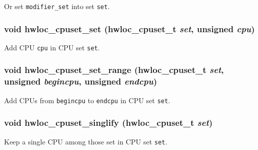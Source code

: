 Or set {\tt modifier\_\-set} into set {\tt set}. 

\hypertarget{group__hwlocality__cpuset_gc5ba8c6d6367436995f67dbd4b3ba1de}{
\subsubsection[{hwloc\_\-cpuset\_\-set}]{\setlength{\rightskip}{0pt plus 5cm}void hwloc\_\-cpuset\_\-set ({\bf hwloc\_\-cpuset\_\-t} {\em set}, \/  unsigned {\em cpu})}}
\label{group__hwlocality__cpuset_gc5ba8c6d6367436995f67dbd4b3ba1de}


Add CPU {\tt cpu} in CPU set {\tt set}. 

\hypertarget{group__hwlocality__cpuset_g9bcf94a6a5c877071116ff2f4a395956}{
\subsubsection[{hwloc\_\-cpuset\_\-set\_\-range}]{\setlength{\rightskip}{0pt plus 5cm}void hwloc\_\-cpuset\_\-set\_\-range ({\bf hwloc\_\-cpuset\_\-t} {\em set}, \/  unsigned {\em begincpu}, \/  unsigned {\em endcpu})}}
\label{group__hwlocality__cpuset_g9bcf94a6a5c877071116ff2f4a395956}


Add CPUs from {\tt begincpu} to {\tt endcpu} in CPU set {\tt set}. 

\hypertarget{group__hwlocality__cpuset_g548a6620cce008fc5b1e2110d25135fe}{
\subsubsection[{hwloc\_\-cpuset\_\-singlify}]{\setlength{\rightskip}{0pt plus 5cm}void hwloc\_\-cpuset\_\-singlify ({\bf hwloc\_\-cpuset\_\-t} {\em set})}}
\label{group__hwlocality__cpuset_g548a6620cce008fc5b1e2110d25135fe}


Keep a single CPU among those set in CPU set {\tt set}. 


